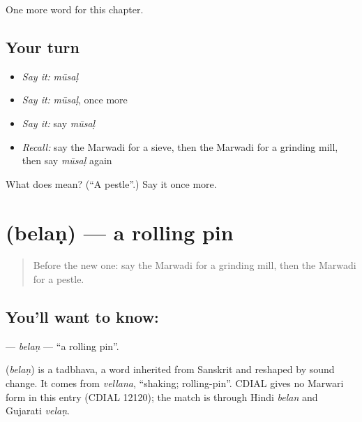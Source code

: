 \begin{grammarlens}[title={What you've built}]
One more word for this chapter.
\end{grammarlens}

\subsection*{Your turn}
\begin{itemize}
\raggedright
  \item \emph{Say it:} \emph{mūsaḷ}
  \item \emph{Say it:} \emph{mūsaḷ}, once more
  \item \emph{Say it:} say \emph{mūsaḷ}
  \item \emph{Recall:} say the Marwadi for a sieve, then the Marwadi for a grinding mill, then say \emph{mūsaḷ} again
\end{itemize}

\begin{tcolorbox}[breakable,colback=teal!4,colframe=teal!35!black,title={Before you move on}]
What does  mean? (\textquotedblleft{}A pestle\textquotedblright{}.) Say it once more.
\end{tcolorbox}
\section[\texorpdfstring{\mw{बेलण} (belaṇ)}{बेलण (belaṇ)}]{ (belaṇ) — a rolling pin}

\label{lesson:MW-C120-belan}



\begin{quote}
Before the new one: say the Marwadi for a grinding mill, then the Marwadi for a pestle.
\end{quote}

\subsection*{You'll want to know: }
\textbf{} — \emph{belaṇ} — \textquotedblleft{}a rolling pin\textquotedblright{}.

\begin{cousinweb}
\textbf{} (\emph{belaṇ}) is a tadbhava, a word inherited from Sanskrit and reshaped by sound change. It comes from \emph{vellana}, \textquotedblleft{}shaking; rolling-pin\textquotedblright{}. CDIAL gives no Marwari form in this entry (CDIAL 12120); the match is through Hindi \emph{belan} and Gujarati \emph{velaṇ}.
\end{cousinweb}

